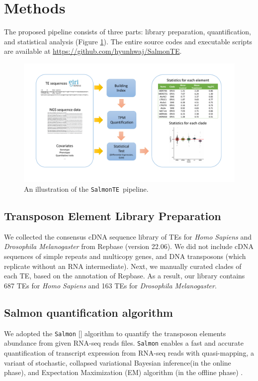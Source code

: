 \documentclass{ws-procs11x85}
\newcommand{\SalmonTE}{\texttt{SalmonTE}}
\begin{document}
\section{Methods}

The proposed pipeline consists of three parts: library preparation, quantification, and statistical analysis (Figure \ref{aba:fig1}). 
The entire source codes and executable scripts are available at \url{https://github.com/hyunhwaj/SalmonTE}. 

\begin{figure}[!ht]
\centerline{
\includegraphics[width=16cm]{fig1.pdf}
}
\caption{An illustration of the \SalmonTE~pipeline.}
\label{aba:fig1}
\end{figure}

\subsection{Transposon Element Library Preparation}
We collected the consensus cDNA sequence library of TEs for \textit{Homo Sapiens} and \textit{Drosophila Melanogaster} from Repbase  
(version 22.06)\cite{repbase}. We did not include cDNA sequences of simple repeats and multicopy genes, and DNA transposons (which replicate without an RNA intermediate). 
Next, we manually curated clades of each TE, based on the annotation of Repbase. As a result, our library contains 687 TEs for \textit{Homo Sapiens} and 163 TEs for \textit{Drosophila Melanogaster}.

\subsection{Salmon quantification algorithm}
We adopted the \verb|Salmon| [] algorithm to quantify the transposon elements abundance from given RNA-seq reads files. \verb|Salmon| enables a fast and accurate quantification of transcript expression from RNA-seq reads with quasi-mapping, a variant of stochastic, collapsed variational Bayesian inference(in the online phase), and Expectation Maximization (EM) algorithm (in the offline phase)
\cite{patro2017salmon,srivastava2016rapmap,bishop2006pattern,foulds2013stochastic}. 
\end{document}
